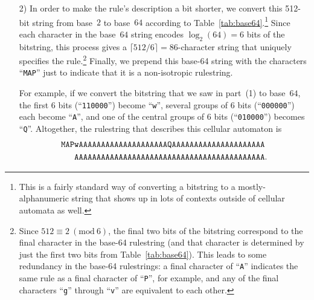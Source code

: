 \begin{itemize}
	\item[2)] In order to make the rule's description a bit shorter, we convert this 512-bit string from base~$2$ to base~$64$ according to Table~\ref{tab:base64}.\footnote{This is a fairly standard way of converting a bitstring to a mostly-alphanumeric string that shows up in lots of contexts outside of cellular automata as well.} Since each character in the base~$64$ string encodes $\log_2(64) = 6$ bits of the bitstring, this process gives a $\lceil 512/6 \rceil = 86$-character string that uniquely specifies the rule.\footnote{Since $512 \equiv 2 \ (\text{mod} \ 6)$, the final two bits of the bitstring correspond to the final character in the base-64 rulestring (and that character is determined by just the first two bits from Table~\ref{tab:base64}). This leads to some redundancy in the base-64 rulestrings: a final character of ``\texttt{A}'' indicates the same rule as a final character of ``\texttt{P}'', for example, and any of the final characters ``\texttt{g}'' through ``\texttt{v}'' are equivalent to each other.} Finally, we prepend this base-64 string with the characters ``\texttt{MAP}'' just to indicate that it is a non-isotropic rulestring.
	
	For example, if we convert the bitstring that we saw in part~(1) to base~$64$, the first 6 bits (``\texttt{110000}'') become ``\texttt{w}'', several groups of 6 bits (``\texttt{000000}'') each become ``\texttt{A}'', and one of the central groups of 6 bits (``\texttt{010000}'') becomes ``\texttt{Q}''. Altogether, the rulestring that describes this cellular automaton is
	\begin{align*}
		& \texttt{MAPwAAAAAAAAAAAAAAAAAAAAQAAAAAAAAAAAAAAAAAAAAA} \\
		& \texttt{\hphantom{MAP}AAAAAAAAAAAAAAAAAAAAAAAAAAAAAAAAAAAAAAAAAAA}.
	\end{align*}
\end{itemize}

\clearpage%

